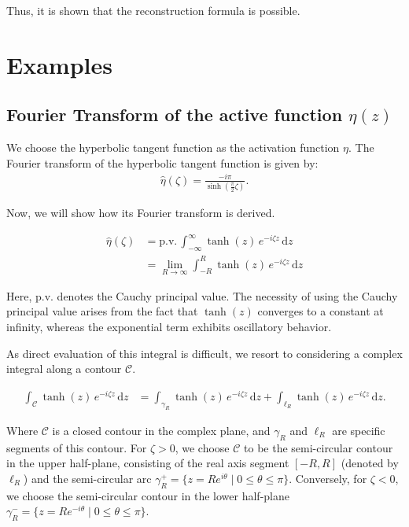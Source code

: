\documentclass[a4paper,12pt]{article}
\newcommand{\intinf}{\int_{-\infty}^{\infty}}
\newcommand{\z}{\zeta}
\newcommand{\dd}{\mathrm{d}}
\newcommand{\etahat}{\widehat{\eta}}
\begin{document}
Thus, it is shown that the reconstruction formula is possible.

\clearpage


\section{Examples}
\subsection{Fourier Transform of the active function $\eta(z)$}

We choose the hyperbolic tangent function as the activation function $\eta$.
The Fourier transform of the hyperbolic tangent function is given by:
\begin{align}
  \etahat(\z) = \frac{-i \pi}{\sinh\left(\frac{\pi}{2} \z\right)}.
\end{align}

Now, we will show how its Fourier transform is derived.

\begin{align*}
  \etahat(\z) &= \text{p.v.}\, \intinf \tanh(z) \, e^{-i\z z} \, \dd z \\
  &= \lim_{R \to \infty} \int_{-R}^{R} \tanh(z) \, e^{-i\z z} \, \dd z 
\end{align*}

Here, p.v. denotes the Cauchy principal value. The necessity of using the Cauchy principal value arises from the fact that $\tanh(z)$ converges to a constant at infinity, whereas the exponential term exhibits oscillatory behavior.

As direct evaluation of this integral is difficult, we resort to considering a complex integral along a contour $\mathcal{C}$.

\begin{align*}
  \int_{\mathcal{C}} \tanh(z) \, e^{-i\z z} \, \dd z &= \int_{\gamma_R} \tanh(z) \, e^{-i\z z} \, \dd z + \int_{\ell_R} \tanh(z) \, e^{-i\z z} \, \dd z.
\end{align*}

Where $\mathcal{C}$ is a closed contour in the complex plane, and $\gamma_R$ and $\ell_R$ are specific segments of this contour. For $\zeta > 0$, we choose $\mathcal{C}$ to be the semi-circular contour in the upper half-plane,
consisting of the real axis segment $[-R, R]$ (denoted by $\ell_R$) and the semi-circular arc $\gamma^+_R = \{ z = R e^{i\theta} \mid 0 \leq \theta \leq \pi \}$. Conversely, for $\zeta < 0$,
we choose the semi-circular contour in the lower half-plane $\gamma^-_R = \{ z = R e^{-i\theta} \mid 0 \leq \theta \leq \pi \}$.
\end{document}
